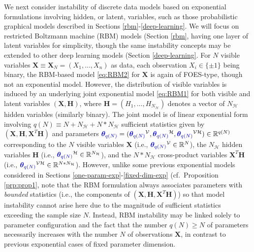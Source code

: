 \documentclass[numbib]{imamat}
\theoremstyle{theorem}
\theoremstyle{lemma}
\theoremstyle{example}
\theoremstyle{corollary}
\theoremstyle{definition}
\theoremstyle{remark}
\theoremstyle{approximation}
\theoremstyle{scheme}
\newcommand{\thetaidx}{q(N)}
\newcommand{\thetaN}{\boldsymbol \theta_{\thetaidx}}
\newcommand{\ak}[1]{{\color{blue} #1}}
\begin{document}
We next consider instability of discrete data models based on exponential formulations involving hidden, or latent, variables, such as those probabilistic graphical models described in Sections \ref{rbm}-\ref{deep-learning}. We will focus on restricted Boltzmann machine (RBM) models (Section \ref{rbm}, having one layer of latent variables for simplicity, though the same instability concepts may be extended to other deep learning models (Section \ref{deep-learning}. For \(N\) visible variables \(\boldsymbol X \equiv \boldsymbol X_N = (X_1,\ldots,X_n)\) as data, each observation \(X_i\in\{\pm 1\}\) being binary, the RBM-based model \eqref{eq:RBM2} for \(\boldsymbol X\) is again of FOES-type, though not an exponential model. However, the distribution of visible variables is induced by an underlying joint exponential model \eqref{eq:RBM1} for both visible and latent variables \((\boldsymbol X, \boldsymbol H)\), where \(\boldsymbol H = (H_1,\ldots,H_{N_{\mathcal{H}}})\) denotes a vector of \(N_{\mathcal{H}}\) hidden variables (similarly binary). The joint model is of linear exponential form involving \(q(N)\equiv N + N_{\mathcal{H}} + N*N_{\mathcal{H}}\) sufficient statistics given by \((\boldsymbol X, \boldsymbol H, \boldsymbol X^T\boldsymbol H)\) and parameters \(\ak{\thetaN} = (\ak{\thetaN}^{\mathcal{V}}, \ak{\thetaN}^{\mathcal{H}}, \ak{\thetaN}^{\mathcal{VH}} ) \in\mathbb{R}^{q(N)}\) corresponding to the \(N\) visible variables \(\boldsymbol X\) (i.e., \(\ak{\thetaN}^{\mathcal{V}}\in\mathbb{R}^N\)), the \(N_{\mathcal{H}}\) hidden variables \(\boldsymbol H\) (i.e., \(\ak{\thetaN}^{\mathcal{H}}\in\mathbb{R}^{N_{\mathcal{H}}}\)), and the \(N *N_{\mathcal{H}}\) cross-product variables \(\boldsymbol X^T\boldsymbol H\) (i.e., \(\ak{\thetaN}^{\mathcal{VH}}\in\mathbb{R}^{N*N_{\mathcal{H}}}\)). However, unlike some previous exponential models considered in Sections \ref{one-param-exp}-\ref{fixed-dim-exp} (cf.~Proposition \ref{prp:prop1}, note that the RBM formulation always associates parameters with \emph{bounded} statistics (i.e., the components of \((\boldsymbol X, \boldsymbol H, \boldsymbol X^T\boldsymbol H)\)) so that model instability cannot arise here due to the magnitude of sufficient statistics exceeding the sample size \(N\). Instead, RBM instability may be linked solely to parameter configuration and the fact that the number \(q(N) \geq N\) of parameters necessarily increases with the number \(N\) of observations \(\boldsymbol X\), in contrast to previous exponential cases of fixed parameter dimension.
\end{document}

